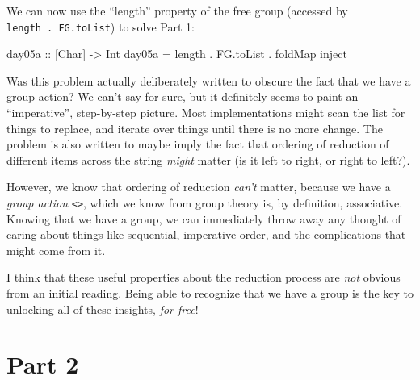 \documentclass[]{article}
\newenvironment{Shaded}{}{}
\newcommand{\DataTypeTok}[1]{\textcolor[rgb]{0.56,0.13,0.00}{#1}}
\newcommand{\FunctionTok}[1]{\textcolor[rgb]{0.02,0.16,0.49}{#1}}
\newcommand{\NormalTok}[1]{#1}
\newcommand{\OtherTok}[1]{\textcolor[rgb]{0.00,0.44,0.13}{#1}}
\begin{document}
We can now use the ``length'' property of the free group (accessed by
\texttt{length\ .\ FG.toList}) to solve Part 1:

\begin{Shaded}
\begin{Highlighting}[]
\OtherTok{day05a ::}\NormalTok{ [}\DataTypeTok{Char}\NormalTok{] }\OtherTok{->} \DataTypeTok{Int}
\NormalTok{day05a }\FunctionTok{=}\NormalTok{ length }\FunctionTok{.}\NormalTok{ FG.toList }\FunctionTok{.}\NormalTok{ foldMap inject}
\end{Highlighting}
\end{Shaded}

Was this problem actually deliberately written to obscure the fact that we have
a group action? We can't say for sure, but it definitely seems to paint an
``imperative'', step-by-step picture. Most implementations might scan the list
for things to replace, and iterate over things until there is no more change.
The problem is also written to maybe imply the fact that ordering of reduction
of different items across the string \emph{might} matter (is it left to right,
or right to left?).

However, we know that ordering of reduction \emph{can't} matter, because we have
a \emph{group action} \texttt{\textless{}\textgreater{}}, which we know from
group theory is, by definition, associative. Knowing that we have a group, we
can immediately throw away any thought of caring about things like sequential,
imperative order, and the complications that might come from it.

I think that these useful properties about the reduction process are \emph{not}
obvious from an initial reading. Being able to recognize that we have a group is
the key to unlocking all of these insights, \emph{for free}!

\hypertarget{part-2}{%
\section{Part 2}\label{part-2}}
\end{document}
